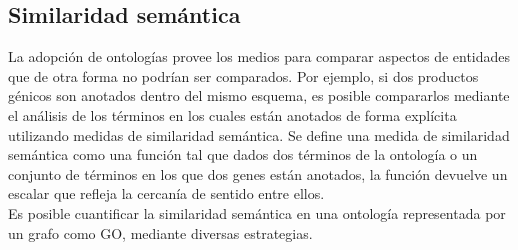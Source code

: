 \subsection{Similaridad semántica}
La adopción de ontologías provee los medios para comparar aspectos de entidades que de otra forma no podrían ser comparados. Por ejemplo, si dos productos génicos son anotados dentro del mismo esquema, es posible compararlos mediante el análisis de los términos en los cuales están anotados de forma explícita utilizando medidas de similaridad semántica. Se define una medida de similaridad semántica como una función tal que dados dos términos de la ontología o un conjunto de términos en los que dos genes están anotados, la función devuelve un escalar que refleja la cercanía de sentido entre ellos.\\
Es posible cuantificar la similaridad semántica en una ontología representada por un grafo como GO, mediante diversas estrategias.
